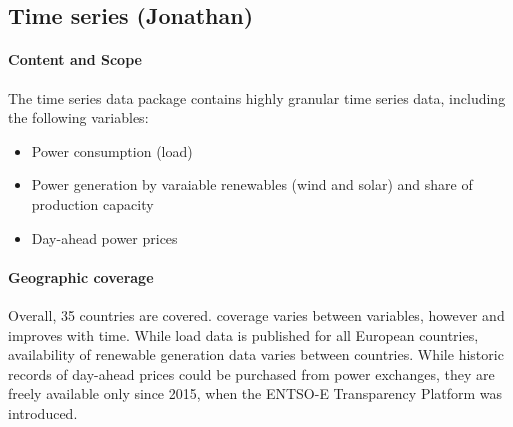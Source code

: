 \documentclass[article]{elsarticle}
\begin{document}

\subsection{Time series (Jonathan)}
\label{subsec:time series}

\paragraph{Content and Scope}
The time series data package contains highly granular time series data, including the following variables:
\begin{itemize}
    \item Power consumption (load)
    \item Power generation by varaiable renewables (wind and solar) and share of production capacity 
    \item Day-ahead power prices
\end{itemize}

\paragraph{Geographic coverage}
Overall, 35 countries are covered. coverage varies between variables, however and improves with time. While load data is published for all European countries, availability of renewable generation data varies between countries. While historic records of day-ahead prices could be purchased from power exchanges, they are freely available only since 2015, when the ENTSO-E Transparency Platform was introduced.
\end{document}
